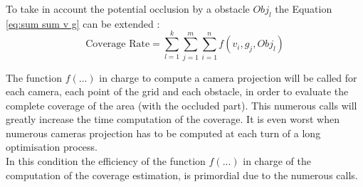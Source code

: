 To take in account the potential occlusion by a obstacle $Obj_l$ the Equation \ref{eq:sum sum v g} can be extended : 
	\begin{equation}
		 \mbox{Coverage Rate}=\sum_{l=1}^{k}\sum_{j=1}^{m}\sum_{i=1}^{n}f( v_i,g_j,Obj_l)
	\end{equation} 
 
The function $f(...)$ in charge to compute a camera projection will be called for each camera, each point of the grid and each obstacle, in order to evaluate the complete coverage of the area (with the occluded part). This numerous calls will greatly increase the time computation of the coverage. It is even worst when numerous cameras projection has to be computed at each turn of a long optimisation process.\\
In this condition the efficiency of the function $f(...)$ in charge of the computation of the coverage estimation, is primordial due to the numerous calls. 
